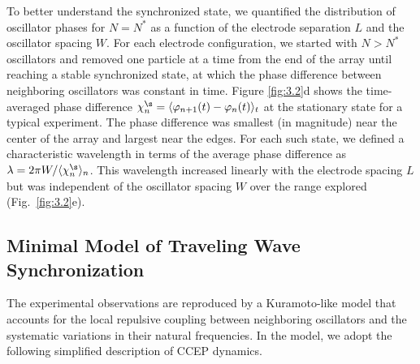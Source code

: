 To better understand the synchronized state, we quantified the distribution of oscillator phases for $N = N^*$ as a function of the electrode separation $L$ and the oscillator spacing $W$. For each electrode configuration, we started with $N>N^*$ oscillators and removed one particle at a time from the end of the array until reaching a stable synchronized state, at which the phase difference between neighboring oscillators was constant in time. Figure \ref{fig:3.2}d shows the time-averaged phase difference $\chi^{\s}_n = \langle \varphi_{n+1}(t) - \varphi_n(t) \rangle_t$ at the stationary state for a typical experiment. The phase difference was smallest (in magnitude) near the center of the array and largest near the edges. For each such state, we defined a characteristic wavelength in terms of the average phase difference as $\lambda = 2\pi W / \langle \chi_n^{\s} \rangle_n$. This wavelength increased linearly with the electrode spacing $L$ but was independent of the oscillator spacing $W$ over the range explored (Fig.~\ref{fig:3.2}e).

\subsection{Minimal Model of Traveling Wave Synchronization}

The experimental observations are reproduced by a Kuramoto-like model \autocite{Acebron2005} that accounts for the local repulsive coupling between neighboring oscillators and the systematic variations in their natural frequencies.  In the model, we adopt the following simplified description of CCEP dynamics\autocite{Kowalik2016}. 

